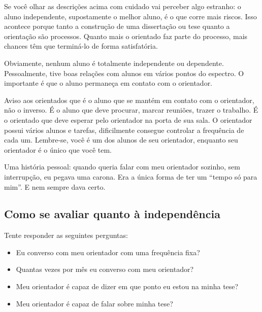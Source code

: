 Se você olhar as descrições acima com cuidado vai perceber algo estranho: o aluno independente, supostamente o melhor aluno, é o que corre mais riscos. Isso acontece porque tanto a construção de uma dissertação ou tese quanto a orientação são processos. Quanto mais o orientado faz parte do processo, mais chances têm que terminá-lo de forma satisfatória.


Obviamente, nenhum aluno é totalmente independente ou dependente. Pessoalmente, tive boas relações com alunos em vários pontos do espectro. O importante é que o aluno permaneça em contato com o orientador. 


Aviso aos orientados que é o aluno que se mantém em contato com o orientador, não o inverso. É o aluno que deve procurar, marcar reuniões, trazer o trabalho. É o orientado que deve esperar pelo orientador na porta de sua sala. O orientador possui vários alunos e tarefas, dificilmente consegue controlar a frequência de cada um. Lembre-se, você é um dos alunos de seu orientador, enquanto seu orientador é o único que você tem.




Uma história pessoal: quando queria falar com meu orientador sozinho, sem interrupção, eu pegava uma carona. Era a única forma de ter um “tempo só para mim”. E nem sempre dava certo.


\subsection{Como se avaliar quanto à independência}


Tente responder as seguintes perguntas:
\begin{itemize}
	\item Eu converso com meu orientador com uma frequência fixa?
	\item Quantas vezes por mês eu converso com meu orientador?
	\item Meu orientador é capaz de dizer em que ponto eu estou na minha tese?
	\item Meu orientador é capaz de falar sobre minha tese?
\end{itemize}




